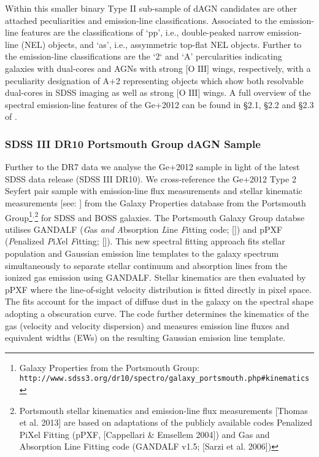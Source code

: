 Within this smaller binary Type II sub-sample of dAGN candidates are other attached peculiarities and emission-line classifications. Associated to the emission-line features are the classifications of `pp', i.e., double-peaked narrow emission-line (NEL) objects, and `as', i.e., assymmetric top-flat NEL objects. Further to the emission-line classifications are the `2` and `A' percularities indicating galaxies with dual-cores and AGNs with strong $\text{[O III]}$ wings, respectively, with a peculiarity designation of A+2 representing objects which show both resolvable dual-cores in SDSS imaging as well as strong $\text{[O III]}$ wings. A full overview of the spectral emission-line features of the Ge+2012 can be found in §2.1, §2.2 and §2.3 of \cite{Ge_Hu_Wang_Bai_Zhang_2012}.   

\subsubsection{SDSS III DR10 Portsmouth Group dAGN Sample}

Further to the DR7 data we analyse the Ge+2012 sample in light of the latest SDSS data release (SDSS III DR10). We cross-reference the Ge+2012 Type 2 Seyfert pair sample with emission-line flux measurements and stellar kinematic measurements [see: \cite{Thomas_2013}] from the Galaxy Properties database from the Portsmouth Group\footnote{\tiny{Galaxy Properties from the Portsmouth Group: \tt{http://www.sdss3.org/dr10/spectro/galaxy_portsmouth.php#kinematics}}}$^{\text{,}}$\footnote{\tiny{Portsmouth stellar kinematics and emission-line flux measurements [Thomas et al. 2013] are based on adaptations of the publicly available codes Penalized PiXel Fitting (pPXF, [Cappellari \& Emsellem 2004]) and Gas and Absorption Line Fitting code (GANDALF v1.5; [Sarzi et al. 2006])}} for SDSS and BOSS galaxies. The Portsmouth Galaxy Group databse utilises GANDALF (\textit{G}as \textit{and} \textit{A}bsorption \textit{L}ine \textit{F}itting code; [\cite{Sarzi_2006}]) and pPXF (\textit{P}enalized \textit{P}i\textit{X}el \textit{F}itting; [\cite{2012ascl.soft10002C}]). This new spectral fitting approach fits stellar population and Gaussian emission line templates to the galaxy spectrum simultaneously to separate stellar continuum and absorption lines from the ionized gas emission using GANDALF. Stellar kinematics are then evaluated by pPXF where the line-of-sight velocity distribution is fitted directly in pixel space. The fits account for the impact of diffuse dust in the galaxy on the spectral shape adopting a \cite{Calzetti_2001} obscuration curve. The code further determines the kinematics of the gas (velocity and velocity dispersion) and measures emission line fluxes and equivalent widths (EWs) on the resulting Gaussian emission line template.

